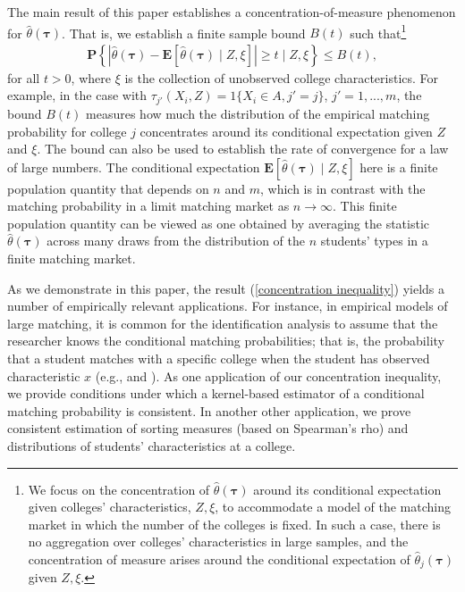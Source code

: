 \documentclass[12pt, fullpage]{amsart}
\theoremstyle{definition}
\theoremstyle{definition}
\theoremstyle{definition}
\begin{document}
\begin{bibunit}[econometrica]
    The main result of this paper establishes a concentration-of-measure phenomenon for  $\hat \theta(\boldsymbol{\tau})$. That is, we establish a finite sample bound $B(t)$ such that\footnote{We focus on the concentration of $\hat \theta(\boldsymbol{\tau})$ around its conditional expectation given colleges' characteristics, $Z, \xi$, to accommodate a model of the matching market in which the number of the colleges is fixed. In such a case, there is no aggregation over colleges' characteristics in large samples, and the concentration of measure arises around the conditional expectation of $\hat \theta_j(\boldsymbol{\tau})$ given $Z, \xi$.}
    \begin{align}
    	\label{concentration inequality}
    	\mathbf{P}\left\{\left| 	\hat \theta(\boldsymbol{\tau}) -  \mathbf{E}[\hat \theta(\boldsymbol{\tau}) \mid Z, \xi] \right| \ge t \mid Z, \xi \right\} \le B(t),
    \end{align}
    for all $t > 0$, where $\xi$ is the collection of unobserved college characteristics. For example, in the case with $\tau_{j'}(X_{i},Z)=1\{X_{i}\in A, j' = j\}$, $j'=1,...,m$, the bound $B(t)$ measures how much the distribution of the empirical matching probability for college $j$ concentrates around its conditional expectation given $Z$ and $\xi$. The bound can also be used to establish the rate of convergence for a law of large numbers. The conditional expectation $ \mathbf{E}[\hat \theta(\boldsymbol{\tau}) \mid Z, \xi]$ here is a finite population quantity that depends on $n$ and $m$, which is in contrast with the matching probability in a limit matching market as $n \rightarrow \infty$. This finite population quantity can be viewed as one obtained by averaging the statistic $\hat \theta(\boldsymbol{\tau})$  across many draws from the distribution of the $n$ students' types in a finite matching market.
    
    As we demonstrate in this paper, the result (\ref{concentration inequality}) yields a number of empirically relevant applications. For instance, in empirical models of large matching, it is common for the identification analysis to assume that the researcher knows the conditional matching probabilities; that is, the probability that a student matches with a specific college when the student has observed characteristic $x$ (e.g., \cite{Diamond/Agarwal:2017:QE} and \cite{He/Sinha/Sun:22:WP}).  As one application of our concentration inequality, we provide conditions under which a kernel-based estimator of a conditional matching probability is consistent. In another other application, we prove consistent estimation of sorting measures (based on Spearman's rho) and distributions of students' characteristics at a college.
    

\end{bibunit}
\end{document}
